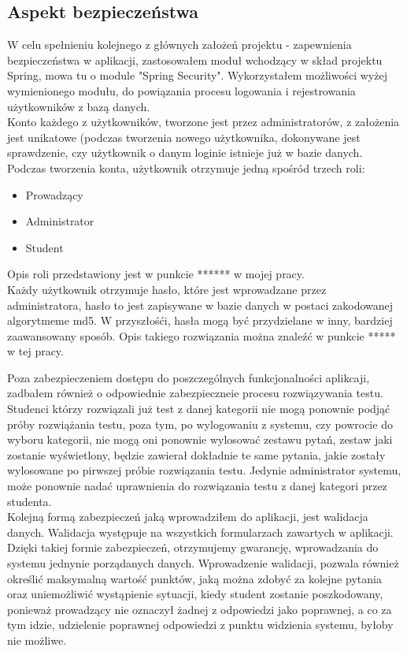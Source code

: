 \documentclass[a4paper, titlepage]{article}
\begin{document}
\begin{itemize}
\section{Aspekt bezpieczeństwa}
			W celu spełnieniu kolejnego z głównych założeń projektu - zapewnienia bezpieczeństwa w aplikacji, zastosowałem moduł wchodzący w skład projektu Spring, mowa tu o module "Spring Security". Wykorzystałem możliwości wyżej wymienionego modułu, do powiązania procesu logowania i rejestrowania użytkowników z bazą danych. 
			\\ Konto każdego z użytkowników, tworzone jest przez administratorów, z założenia jest unikatowe (podczas tworzenia nowego użytkownika, dokonywane jest sprawdzenie, czy użytkownik o danym loginie istnieje już w bazie danych. Podczas tworzenia konta, użytkownik otrzymuje jedną spośród trzech roli:
				\begin{itemize}
				\item Prowadzący
				\item Administrator
				\item Student
				\end{itemize}
				Opis roli przedstawiony jest w punkcie ****** w mojej pracy.
				\\ Każdy użytkownik otrzymuje hasło, które jest wprowadzane przez administratora, hasło to jest zapisywane w bazie danych w postaci zakodowanej algorytmeme md5. W przyszłośći, hasła mogą być przydzielane w inny, bardziej zaawansowany sposób. Opis takiego rozwiązania można znaleźć w punkcie ***** w tej pracy.

				\end{itemize}
				Poza zabezpieczeniem dostępu do poszczególnych funkcjonalności aplikcaji, zadbałem również o odpowiednie zabezpieczneie procesu rozwiązywania testu. Studenci którzy rozwiązali już test z danej kategorii nie mogą ponownie podjąć próby rozwiążania testu, poza tym, po wylogowaniu z systemu, czy powrocie do wyboru kategorii, nie mogą oni ponownie wylosować zestawu pytań, zestaw jaki zostanie wyświetlony, będzie zawierał dokładnie te same pytania, jakie zostały wylosowane po pirwszej próbie rozwiązania testu. Jedynie administrator systemu, może ponownie nadać uprawnienia do rozwiązania testu z danej kategori przez studenta.
\\Kolejną formą zabezpieczeń jaką wprowadziłem do aplikacji, jest walidacja danych. Walidacja występuje na wszystkich formularzach zawartych w aplikacji. Dzięki takiej formie zabezpieczeń, otrzymujemy gwarancję, wprowadzania do systemu jednynie porządanych danych. Wprowadzenie walidacji, pozwala również określić maksymalną wartość punktów, jaką można zdobyć za kolejne pytania oraz uniemożliwić wystąpienie sytuacji, kiedy student zostanie poszkodowany, ponieważ prowadzący nie oznaczył żadnej z odpowiedzi jako poprawnej, a co za tym idzie, udzielenie poprawnej odpowiedzi z punktu widzienia systemu, byłoby nie możliwe.
				
\end{document}
